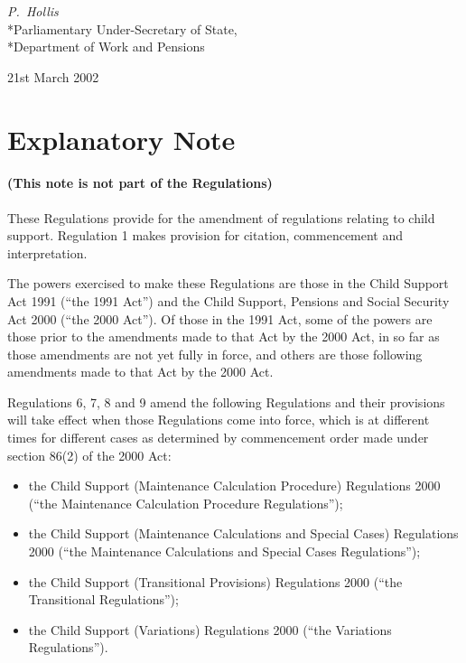 \documentclass[12pt,a4paper]{article}
\begin{document}
{\raggedleft
\emph{P.~Hollis}\\*Parliamentary Under-Secretary of State,\\*Department of Work and Pensions

}

21st March 2002

\small

\part{Explanatory Note}

\renewcommand\parthead{— Explanatory Note}

\subsection*{(This note is not part of the Regulations)}

These Regulations provide for the amendment of regulations relating to child support. Regulation 1 makes provision for citation, commencement and interpretation.

The powers exercised to make these Regulations are those in the Child Support Act 1991 (“the 1991 Act”) and the Child Support, Pensions and Social Security Act 2000 (“the 2000 Act”). Of those in the 1991 Act, some of the powers are those prior to the amendments made to that Act by the 2000 Act, in so far as those amendments are not yet fully in force, and others are those following amendments made to that Act by the 2000 Act.

Regulations 6, 7, 8 and 9 amend the following Regulations and their provisions will take effect when those Regulations come into force, which is at different times for different cases as determined by commencement order made under section 86(2) of the 2000 Act:
\begin{itemize}\item
    the Child Support (Maintenance Calculation Procedure) Regulations 2000 (“the Maintenance Calculation Procedure Regulations”);
\item
    the Child Support (Maintenance Calculations and Special Cases) Regulations 2000 (“the Maintenance Calculations and Special Cases Regulations”);
\item
    the Child Support (Transitional Provisions) Regulations 2000 (“the Transitional Regulations”);
\item
    the Child Support (Variations) Regulations 2000 (“the Variations Regulations”). 
\end{itemize}
\end{document}
